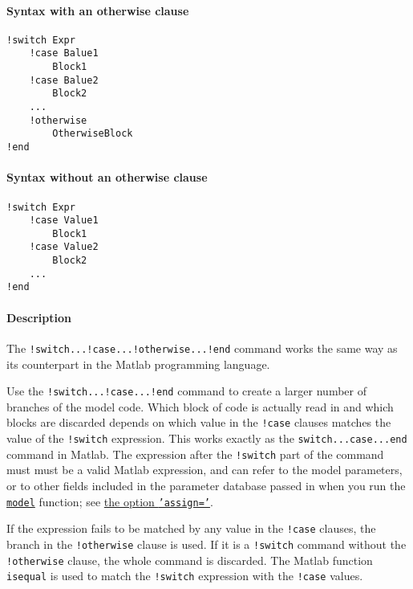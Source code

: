 


	\paragraph{Syntax with an otherwise
clause}

\begin{verbatim}
!switch Expr
    !case Balue1
        Block1
    !case Balue2
        Block2
    ...
    !otherwise
        OtherwiseBlock
!end
\end{verbatim}

\paragraph{Syntax without an otherwise
clause}

\begin{verbatim}
!switch Expr
    !case Value1
        Block1
    !case Value2
        Block2
    ...
!end
\end{verbatim}

\paragraph{Description}

The \texttt{!switch...!case...!otherwise...!end} command works the same
way as its counterpart in the Matlab programming language.

Use the \texttt{!switch...!case...!end} command to create a larger
number of branches of the model code. Which block of code is actually
read in and which blocks are discarded depends on which value in the
\texttt{!case} clauses matches the value of the \texttt{!switch}
expression. This works exactly as the \texttt{switch...case...end}
command in Matlab. The expression after the \texttt{!switch} part of the
command must must be a valid Matlab expression, and can refer to the
model parameters, or to other fields included in the parameter database
passed in when you run the \href{model/model}{\texttt{model}} function;
see \href{model/model}{the option \texttt{'assign='}}.

If the expression fails to be matched by any value in the \texttt{!case}
clauses, the branch in the \texttt{!otherwise} clause is used. If it is
a \texttt{!switch} command without the \texttt{!otherwise} clause, the
whole command is discarded. The Matlab function \texttt{isequal} is used
to match the \texttt{!switch} expression with the \texttt{!case} values.

